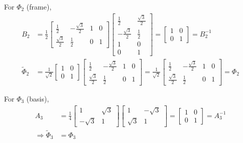 \begin{enumerate}[(a)]
For $\Phi_2$ (frame),
\begin{align*}
	B_2 &= \frac{1}{2} \begin{bmatrix}
	\frac{1}{2} & -\frac{\sqrt{3}}{2} & 1 & 0 \\
	\frac{\sqrt{3}}{2} & \frac{1}{2} & 0 & 1
	\end{bmatrix} \begin{bmatrix}
	\frac{1}{2} & \frac{\sqrt{3}}{2} \\
	-\frac{\sqrt{3}}{2} & \frac{1}{2} \\
	1 & 0\\
	0 & 1
	\end{bmatrix}= \begin{bmatrix}
	1 & 0 \\
	0 & 1
	\end{bmatrix} = B_2^{-1} \\
	\tilde{\Phi}_2 &= \frac{1}{\sqrt{2}}\begin{bmatrix}
	1 & 0 \\
	0 & 1
	\end{bmatrix} \begin{bmatrix}
	\frac{1}{2} & -\frac{\sqrt{3}}{2} & 1 & 0 \\
	\frac{\sqrt{3}}{2} & \frac{1}{2} & 0 & 1
	\end{bmatrix} = \frac{1}{\sqrt{2}} \begin{bmatrix}
	\frac{1}{2} & -\frac{\sqrt{3}}{2} & 1 & 0 \\
	\frac{\sqrt{3}}{2} & \frac{1}{2} & 0 & 1
	\end{bmatrix} = \Phi_2
\end{align*}

For $\Phi_3$ (basis),
\begin{align*}
	A_3 &= \frac{1}{4}\begin{bmatrix}
	1 & \sqrt{3} \\ -\sqrt{3} & 1
	\end{bmatrix} \begin{bmatrix}
	1 & -\sqrt{3} \\ \sqrt{3} & 1
	\end{bmatrix} = \begin{bmatrix}
	1 & 0 \\ 0 & 1
	\end{bmatrix} = A_3^{-1} \\
	\Rightarrow \tilde{\Phi}_3 &= \Phi_3
\end{align*}


\end{enumerate}
